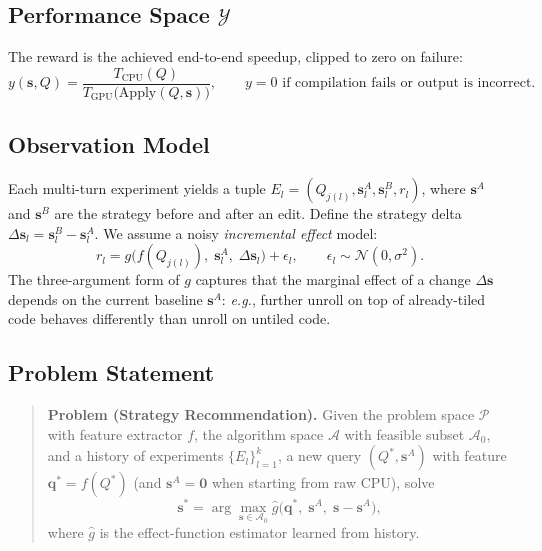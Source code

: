 \documentclass{article}
\begin{document}
\subsection{Performance Space $\mathcal{Y}$}
The reward is the achieved end-to-end speedup, clipped to zero on
failure:
\begin{equation}
y(\mathbf{s}, Q) = \frac{T_{\mathrm{CPU}}(Q)}{T_{\mathrm{GPU}}\bigl(\mathrm{Apply}(Q, \mathbf{s})\bigr)},
\qquad
y = 0 \text{ if compilation fails or output is incorrect}.
\label{eq:reward}
\end{equation}

\subsection{Observation Model}
Each multi-turn experiment yields a tuple
$E_l = (Q_{j(l)}, \mathbf{s}_l^A, \mathbf{s}_l^B, r_l)$, where
$\mathbf{s}^A$ and $\mathbf{s}^B$ are the strategy before and after
an edit. Define the strategy delta
$\Delta \mathbf{s}_l = \mathbf{s}_l^B - \mathbf{s}_l^A$.
We assume a noisy \emph{incremental effect} model:
\begin{equation}
r_l = g\bigl(f(Q_{j(l)}),\; \mathbf{s}_l^A,\; \Delta \mathbf{s}_l\bigr)
      + \epsilon_l, \qquad
\epsilon_l \sim \mathcal{N}(0, \sigma^2).
\label{eq:incremental}
\end{equation}
The three-argument form of $g$ captures that the marginal effect of a
change $\Delta\mathbf{s}$ depends on the current baseline
$\mathbf{s}^A$: \emph{e.g.}, further unroll on top of already-tiled
code behaves differently than unroll on untiled code.

\subsection{Problem Statement}
\label{sec:problem}
\begin{quote}
\textbf{Problem (Strategy Recommendation).}
Given the problem space $\mathcal{P}$ with feature extractor $f$,
the algorithm space $\mathcal{A}$ with feasible subset
$\mathcal{A}_0$, and a history of experiments
$\{E_l\}_{l=1}^{k}$, a new query
$(Q^*, \mathbf{s}^A)$ with feature
$\mathbf{q}^* = f(Q^*)$ (and $\mathbf{s}^A = \mathbf{0}$ when starting
from raw CPU), solve
\begin{equation}
\mathbf{s}^* = \arg\max_{\mathbf{s} \in \mathcal{A}_0}
  \hat{g}\bigl(\mathbf{q}^*,\; \mathbf{s}^A,\; \mathbf{s} - \mathbf{s}^A\bigr),
\label{eq:objective}
\end{equation}
where $\hat{g}$ is the effect-function estimator learned from history.
\end{quote}
\end{document}
